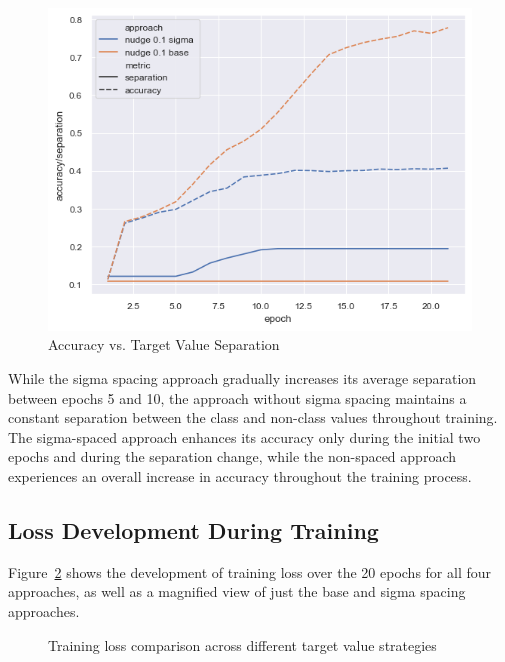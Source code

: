 \documentclass[12pt,fleqn,a4paper]{article}
\begin{document}
\begin{figure}[H]
    \centering
    \includegraphics[width=0.6\linewidth]{graphs/accvsep.png}
    \caption{Accuracy vs. Target Value Separation}
    \label{fig:accvsep}
\end{figure}

While the sigma spacing approach gradually increases its average separation between epochs 5 and 10, the approach without sigma spacing maintains a constant separation between the class and non-class values throughout training. The sigma-spaced approach enhances its accuracy only during the initial two epochs and during the separation change, while the non-spaced approach experiences an overall increase in accuracy throughout the training process.
\subsection{Loss Development During Training}
Figure~\ref{fig:loss} shows the development of training loss over the 20 epochs for all four approaches, as well as a magnified view of just the base and sigma spacing approaches.

\begin{figure}[htbp]
\centering
{}
\hfill
{}
\caption{Training loss comparison across different target value strategies}
\label{fig:loss}
\end{figure}
\end{document}
